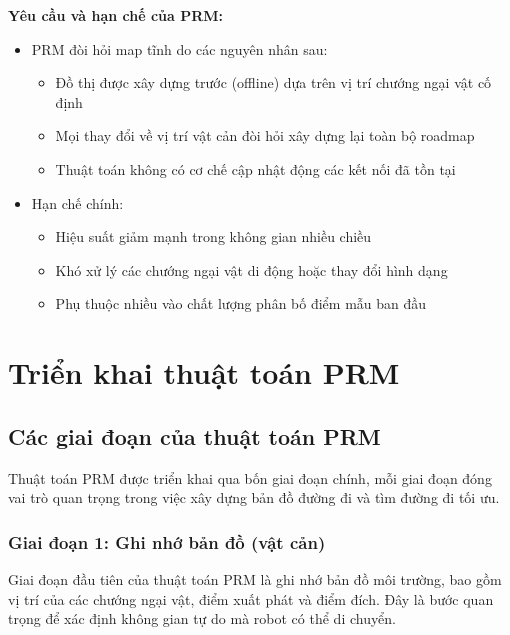\documentclass[12pt,a4paper,openany,oneside]{report}
\begin{document}
\textbf{Yêu cầu và hạn chế của PRM:}
\begin{itemize}
    \item PRM đòi hỏi map tĩnh do các nguyên nhân sau:
    \begin{itemize}
        \item Đồ thị được xây dựng trước (offline) dựa trên vị trí chướng ngại vật cố định
        \item Mọi thay đổi về vị trí vật cản đòi hỏi xây dựng lại toàn bộ roadmap
        \item Thuật toán không có cơ chế cập nhật động các kết nối đã tồn tại
    \end{itemize}
    
    \item Hạn chế chính:
    \begin{itemize}
        \item Hiệu suất giảm mạnh trong không gian nhiều chiều
        \item Khó xử lý các chướng ngại vật di động hoặc thay đổi hình dạng
        \item Phụ thuộc nhiều vào chất lượng phân bố điểm mẫu ban đầu
    \end{itemize}
\end{itemize}

\chapter{Triển khai thuật toán PRM}

\section{Các giai đoạn của thuật toán PRM}

Thuật toán PRM được triển khai qua bốn giai đoạn chính, mỗi giai đoạn đóng vai trò quan trọng trong việc xây dựng bản đồ đường đi và tìm đường đi tối ưu.

\subsection{Giai đoạn 1: Ghi nhớ bản đồ (vật cản)}

Giai đoạn đầu tiên của thuật toán PRM là ghi nhớ bản đồ môi trường, bao gồm vị trí của các chướng ngại vật, điểm xuất phát và điểm đích. Đây là bước quan trọng để xác định không gian tự do mà robot có thể di chuyển.
\end{document}
